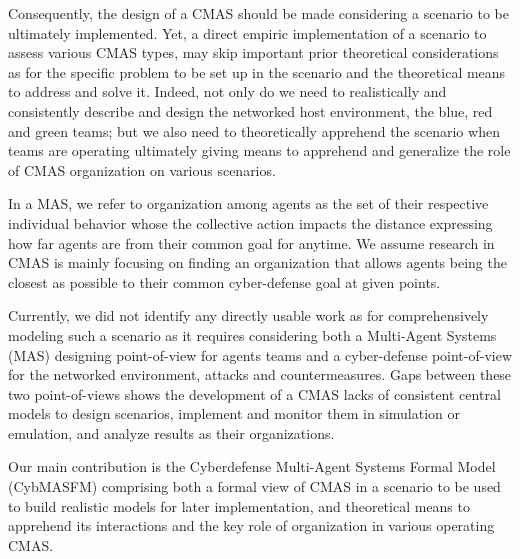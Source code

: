 \documentclass[conference]{IEEEtran}
\begin{document}
Consequently, the design of a CMAS should be made considering a scenario to be ultimately implemented. Yet, a direct empiric implementation of a scenario to assess various CMAS types, may skip important prior theoretical considerations as for the specific problem to be set up in the scenario and the theoretical means to address and solve it. Indeed, not only do we need to realistically and consistently describe and design the networked host environment, the blue, red and green teams; but we also need to theoretically apprehend the scenario when teams are operating ultimately giving means to apprehend and generalize the role of CMAS organization on various scenarios.

In a MAS, we refer to organization among agents as the set of their respective individual behavior whose the collective action impacts the distance expressing how far agents are from their common goal for anytime. We assume research in CMAS is mainly focusing on finding an organization that allows agents being the closest as possible to their common cyber-defense goal at given points.


Currently, we did not identify any directly usable work as for comprehensively modeling such a scenario as it requires considering both a Multi-Agent Systems (MAS) designing point-of-view for agents teams and a cyber-defense point-of-view for the networked environment, attacks and countermeasures.
Gaps between these two point-of-views shows the development of a CMAS lacks of consistent central models to design scenarios, implement and monitor them in simulation or emulation, and analyze results as their organizations.

Our main contribution is the Cyberdefense Multi-Agent Systems Formal Model (CybMASFM) comprising both a formal view of CMAS in a scenario to be used to build realistic models for later implementation, and theoretical means to apprehend its interactions and the key role of organization in various operating CMAS.
\end{document}
